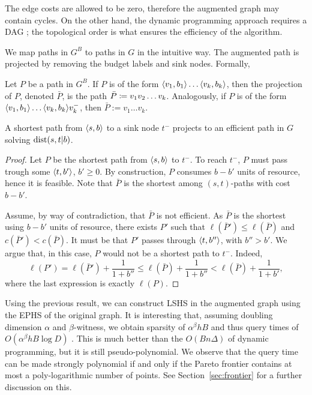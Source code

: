 \begin{remark}
The edge costs are allowed to be zero, therefore the augmented graph may contain cycles.
On the other hand, the dynamic programming approach requires a DAG \cite{alex_bicriteria}; the topological order is what ensures the efficiency of the algorithm.
\end{remark}

We map paths in $G^B$ to paths in $G$ in the intuitive way.
The augmented path is projected by removing the budget labels and sink nodes.
Formally,

\begin{definition}
Let $P$ be a path in $G^B$.
If $P$ is of the form $\langle v_1,b_1\rangle\ldots\langle v_k,b_k\rangle$, then the projection of $P$, denoted $\bar P$, is the path $\bar P\coloneqq v_1v_2\ldots v_k$.
Analogously, if $P$ is of the form $\langle v_1,b_1\rangle\ldots\langle v_k,b_k\rangle v_{k}^-$, then $\bar P:=v_1\ldots v_{k}$. 
\end{definition}


\begin{proposition}\label{prop:shorteffic}
A shortest path from $\langle s,b\rangle$ to a sink node $t^-$ projects to an efficient path in $G$ solving $\text{dist}(s,t|b)$. 
\end{proposition}
\begin{proof}
Let $P$ be the shortest path from $\langle s,b\rangle$ to $t^-$.
To reach $t^-$, $P$ must pass trough some $\langle t,b'\rangle$, $b'\geq 0$.
By construction, $P$ consumes $b-b'$ units of resource, hence it is feasible.
Note that $\bar P$ is the shortest among $(s,t)$-paths with cost $b-b'$.

Assume, by way of contradiction, that $\bar P$ is not efficient.
As $\bar P$ is the shortest using $b-b'$ units of resource, there exists $P'$ such that $\ell(\bar P')\leq \ell(\bar P)$ and $c(\bar P')< c(\bar P)$.
It must be that $P'$ passes through $\langle t,b''\rangle$, with $b''>b'$.
We argue that, in this case, $P$ would not be a shortest path to $t^-$.
Indeed, 
\[
\ell(P')=\ell(\bar P')+\frac{1}{1+b''}
\leq \ell(\bar P) +\frac{1}{1+b''}
< \ell(\bar P) +\frac{1}{1+b'},
\]
where the last expression is exactly $\ell(P)$.
\end{proof}

Using the previous result, we can construct LSHS in the augmented graph using the EPHS of the original graph.
It is interesting that, assuming doubling dimension $\alpha$ and $\beta$-witness, we obtain sparsity of $\alpha^{\beta} hB$ and thus query times of $O(\alpha^{\beta} hB\log D)$ .
This is much better than the $O(Bn\Delta)$ of dynamic programming, but it is still pseudo-polynomial.
We observe that the query time can be made strongly polynomial if and only if the Pareto frontier contains at most a poly-logarithmic number of points.
See Section~\ref{sec:frontier} for a further discussion on this.
 
